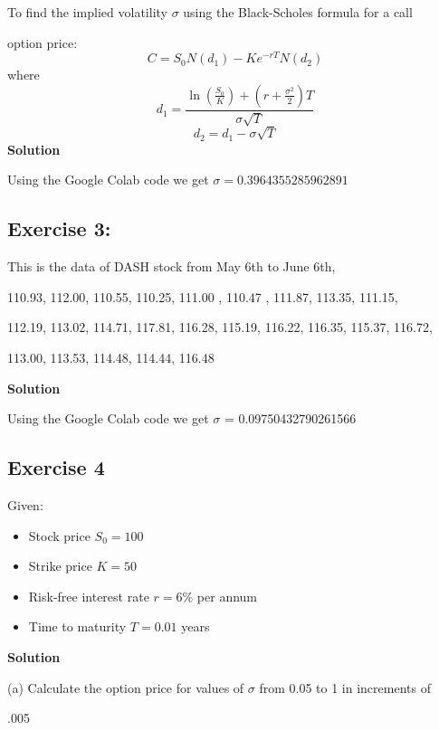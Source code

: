 \documentclass{article}
\begin{document}
To find the implied volatility \( \sigma \) using the Black-Scholes formula for a call 

option price:
\[
C = S_0 N(d_1) - K e^{-rT} N(d_2)
\]
where
\[
d_1 = \frac{\ln\left(\frac{S_0}{K}\right) + \left(r + \frac{\sigma^2}{2}\right) T}{\sigma \sqrt{T}}
\]
\[
d_2 = d_1 - \sigma \sqrt{T}
\]
\textbf{Solution}

Using the Google Colab code we get $\sigma = 0.3964355285962891$

\subsection*{Exercise 3:}

This is the data of DASH stock from May 6th to June 6th,

\vspace{\baselineskip}

110.93, 112.00, 110.55, 110.25, 111.00 , 110.47 , 111.87, 113.35, 111.15, 

112.19, 113.02, 114.71, 117.81, 116.28, 115.19, 116.22, 116.35, 115.37, 116.72, 

113.00, 113.53, 114.48, 114.44, 116.48

\vspace{\baselineskip}

\textbf{Solution}

 Using the Google Colab code we get $\sigma$ = 0.09750432790261566

\subsection*{Exercise 4}

Given:
\begin{itemize}
    \item Stock price \( S_0 = 100 \)
    \item Strike price \( K = 50 \)
    \item Risk-free interest rate \( r = 6\% \) per annum
    \item Time to maturity \( T = 0.01 \) years
\end{itemize}

\textbf{Solution}

(a) Calculate the option price for values of \( \sigma \) from 0.05 to 1 in increments of 

.005
\end{document}
